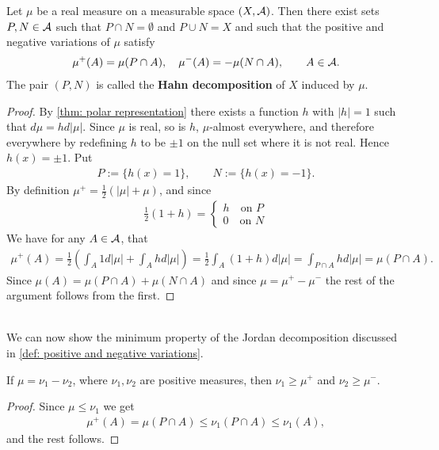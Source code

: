 \documentclass[../../main.tex]{subfiles}
\begin{document}
\begin{theorem}
Let $\mu$ be a real measure on a measurable space $(X, \mathcal{A})$. Then there exist sets $P,N\in \mathcal{A}$ such that $P\cap N=\emptyset$ and $P\cup N = X$ and such that the positive and negative variations of $\mu$ satisfy
\begin{align*}
	\mu^{+}(A)=\mu(P\cap A), \quad \mu^{-}(A)=-\mu(N\cap A), \qquad A\in \mathcal{A}.
\end{align*}
The pair $(P,N)$ is called the \textbf{Hahn decomposition} of $X$ induced by $\mu$.
\end{theorem}
\begin{proof}
By \cref{thm: polar representation} there exists a function $h$ with $|h|=1$ such that $d\mu=hd|\mu|$. Since $\mu$ is real, so is $h$, $\mu$-almost everywhere, and therefore everywhere by redefining $h$ to be $\pm1$ on the null set where it is not real.
Hence $h(x)=\pm 1$. Put
\begin{align*}
	P:=\{h(x)=1\}, \qquad N:=\{h(x)=-1\}.
\end{align*}
By definition $\mu^{+}=\frac{1}{2}(|\mu|+\mu)$, and since
\begin{align*}
	\frac{1}{2}(1+h)=\begin{cases}
	h \quad \text{on } P \\
	0 \quad \text{on } N
	\end{cases}
\end{align*}
We have for any $A\in \mathcal{A}$, that
\begin{align*}
	\mu^{+}(A)=\frac{1}{2}\left( \int_{A}1d|\mu|+\int_{A}hd|\mu| \right)=\frac{1}{2}\int_{A}(1+h)d|\mu|=\int_{P\cap A}hd|\mu|=\mu(P\cap A).
\end{align*}
Since $\mu(A)=\mu(P\cap A)+\mu(N\cap A)$ and since $\mu=\mu^{+}-\mu^{-}$ the rest of the argument follows from the first.
\end{proof}
\text{ } \\
We can now show the minimum property of the Jordan decomposition discussed in \cref{def: positive and negative variations}.

\begin{corollary}\label{cor: Jordan decomp}
If $\mu=\nu_{1}-\nu_{2}$, where $\nu_{1},\nu_{2}$ are positive measures, then $\nu_{1}\ge \mu^{+}$ and $\nu_{2}\ge \mu^{-}$.
\end{corollary}
\begin{proof}
Since $\mu\le \nu_{1}$ we get
\begin{align*}
	\mu^{+}(A)=\mu(P\cap A)\le \nu_{1}(P\cap A)\le \nu_{1}(A),
\end{align*}
and the rest follows.
\end{proof}
\end{document}
